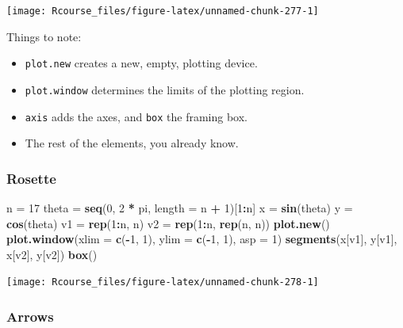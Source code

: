 \documentclass[]{book}
\newenvironment{Shaded}{\begin{snugshade}}{\end{snugshade}}
\newcommand{\DataTypeTok}[1]{\textcolor[rgb]{0.13,0.29,0.53}{#1}}
\newcommand{\DecValTok}[1]{\textcolor[rgb]{0.00,0.00,0.81}{#1}}
\newcommand{\KeywordTok}[1]{\textcolor[rgb]{0.13,0.29,0.53}{\textbf{#1}}}
\newcommand{\NormalTok}[1]{#1}
\newcommand{\OperatorTok}[1]{\textcolor[rgb]{0.81,0.36,0.00}{\textbf{#1}}}
\newcommand{\StringTok}[1]{\textcolor[rgb]{0.31,0.60,0.02}{#1}}
\providecommand{\tightlist}{%
  \setlength{\itemsep}{0pt}\setlength{\parskip}{0pt}}
\theoremstyle{definition}
\theoremstyle{definition}
\theoremstyle{definition}
\theoremstyle{remark}
\begin{document}
\texttt{[image: Rcourse\_files/figure-latex/unnamed-chunk-277-1]}

Things to note:

\begin{itemize}
\tightlist
\item
  \texttt{plot.new} creates a new, empty, plotting device.
\item
  \texttt{plot.window} determines the limits of the plotting region.
\item
  \texttt{axis} adds the axes, and \texttt{box} the framing box.
\item
  The rest of the elements, you already know.
\end{itemize}

\hypertarget{rosette}{%
\subsubsection{Rosette}\label{rosette}}

\begin{Shaded}
\begin{Highlighting}[]
\NormalTok{n =}\StringTok{ }\DecValTok{17}
\NormalTok{theta =}\StringTok{ }\KeywordTok{seq}\NormalTok{(}\DecValTok{0}\NormalTok{, }\DecValTok{2} \OperatorTok{*}\StringTok{ }\NormalTok{pi, }\DataTypeTok{length =}\NormalTok{ n }\OperatorTok{+}\StringTok{ }\DecValTok{1}\NormalTok{)[}\DecValTok{1}\OperatorTok{:}\NormalTok{n]}
\NormalTok{x =}\StringTok{ }\KeywordTok{sin}\NormalTok{(theta)}
\NormalTok{y =}\StringTok{ }\KeywordTok{cos}\NormalTok{(theta)}
\NormalTok{v1 =}\StringTok{ }\KeywordTok{rep}\NormalTok{(}\DecValTok{1}\OperatorTok{:}\NormalTok{n, n)}
\NormalTok{v2 =}\StringTok{ }\KeywordTok{rep}\NormalTok{(}\DecValTok{1}\OperatorTok{:}\NormalTok{n, }\KeywordTok{rep}\NormalTok{(n, n))}
\KeywordTok{plot.new}\NormalTok{()}
\KeywordTok{plot.window}\NormalTok{(}\DataTypeTok{xlim =} \KeywordTok{c}\NormalTok{(}\OperatorTok{-}\DecValTok{1}\NormalTok{, }\DecValTok{1}\NormalTok{), }\DataTypeTok{ylim =} \KeywordTok{c}\NormalTok{(}\OperatorTok{-}\DecValTok{1}\NormalTok{, }\DecValTok{1}\NormalTok{), }\DataTypeTok{asp =} \DecValTok{1}\NormalTok{)}
\KeywordTok{segments}\NormalTok{(x[v1], y[v1], x[v2], y[v2])}
\KeywordTok{box}\NormalTok{()}
\end{Highlighting}
\end{Shaded}

\texttt{[image: Rcourse\_files/figure-latex/unnamed-chunk-278-1]}

\hypertarget{arrows}{%
\subsubsection{Arrows}\label{arrows}}
\end{document}

